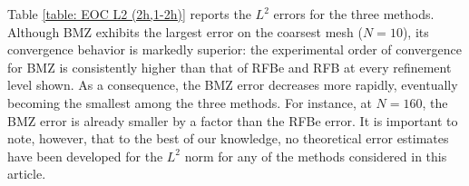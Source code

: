 \documentclass{article}
\newcommand{\delete}[1]{{\color{lightgray}#1}}
\begin{document}
 
 Table \ref{table: EOC L2 (2h,1-2h)} reports the $L^2$ errors for the three methods.
Although BMZ exhibits the largest error on the coarsest mesh ($N=10$), its convergence behavior is markedly superior: the experimental order of convergence for BMZ is consistently higher than that of RFBe and RFB at every refinement level shown. As a consequence, the BMZ error decreases more rapidly, eventually becoming the smallest among the three methods. For instance, at $N=160$, the BMZ error is already smaller by a factor than the RFBe error. It is important to note, however, that to the best of our knowledge, no theoretical error estimates have been developed for the $L^2$ norm for any of the methods considered in this article.
\end{document}
